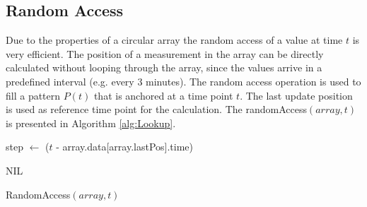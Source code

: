 \documentclass[abstracton,12pt,oneside]{scrreprt}
\begin{document}
\subsection{Random Access}
\label{randi}
Due to the properties of a circular array the random access of a value at time $t$ is very efficient. The position of a measurement in the array can be directly calculated without looping through the array, since the values arrive in a predefined interval (e.g. every 3 minutes). The random access operation is used to fill a pattern $P(t)$ that is anchored at a time point $t$. The last update position is used as reference time point for the calculation. The randomAccess$(array, t)$ is presented in Algorithm \ref{alg:Lookup}.
\BlankLine
\begin{algorithm}[H]
	\IncMargin{1em}
	\SetAlgoLined
	\DontPrintSemicolon
	
	
	
	
	step $\leftarrow$ ($t$ - array.data[array.lastPos].time)\;
	
	
	\Return NIL\;
	
	
	
	
	\caption{RandomAccess$(array, t)$}	
	\label{alg:Lookup}
\end{algorithm}
\end{document}
